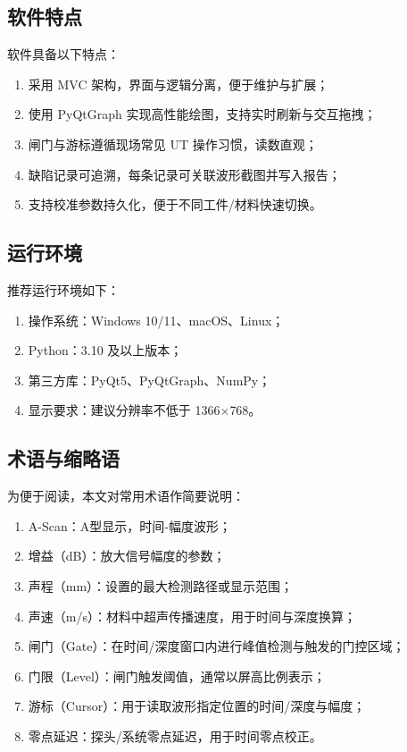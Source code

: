 \subsection{软件特点}
\par
软件具备以下特点：
\begin{enumerate}
	\item 采用 MVC 架构，界面与逻辑分离，便于维护与扩展；
	\item 使用 PyQtGraph 实现高性能绘图，支持实时刷新与交互拖拽；
	\item 闸门与游标遵循现场常见 UT 操作习惯，读数直观；
\underline{}	\item 缺陷记录可追溯，每条记录可关联波形截图并写入报告；
	\item 支持校准参数持久化，便于不同工件/材料快速切换。
\end{enumerate}

\subsection{运行环境}
\par
推荐运行环境如下：
\begin{enumerate}
	\item 操作系统：Windows 10/11、macOS、Linux；
	\item Python：3.10 及以上版本；
	\item 第三方库：PyQt5、PyQtGraph、NumPy；
	\item 显示要求：建议分辨率不低于 1366$\times$768。
\end{enumerate}

\subsection{术语与缩略语}
\par
为便于阅读，本文对常用术语作简要说明：
\begin{enumerate}
	\item A-Scan：A型显示，时间-幅度波形；
	\item 增益（dB）：放大信号幅度的参数；
	\item 声程（mm）：设置的最大检测路径或显示范围；
	\item 声速（m/s）：材料中超声传播速度，用于时间与深度换算；
	\item 闸门（Gate）：在时间/深度窗口内进行峰值检测与触发的门控区域；
	\item 门限（Level）：闸门触发阈值，通常以屏高比例表示；
	\item 游标（Cursor）：用于读取波形指定位置的时间/深度与幅度；
	\item 零点延迟：探头/系统零点延迟，用于时间零点校正。
\end{enumerate}
